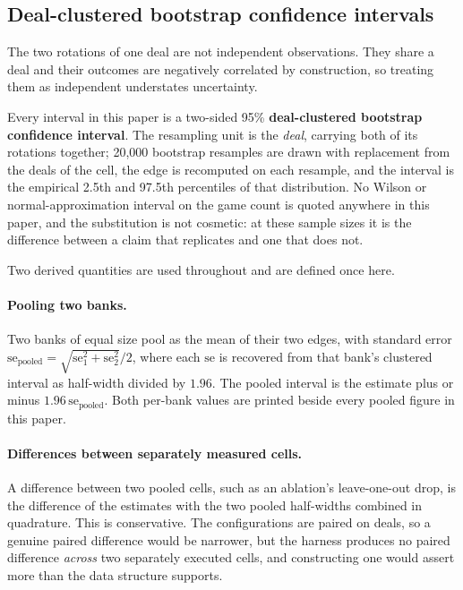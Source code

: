 \subsection{Deal-clustered bootstrap confidence intervals}
\label{sec:evaluation-intervals}

The two rotations of one deal are not independent observations. They share a deal and their outcomes
are negatively correlated by construction, so treating them as independent understates uncertainty.

Every interval in this paper is a two-sided 95\% \textbf{deal-clustered bootstrap confidence
interval}. The resampling unit is the \emph{deal}, carrying both of its rotations together; 20{,}000
bootstrap resamples are drawn with replacement from the deals of the cell, the edge is recomputed on
each resample, and the interval is the empirical 2.5th and 97.5th percentiles of that distribution.
No Wilson or normal-approximation interval on the game count is quoted anywhere in this paper, and
the substitution is not cosmetic: at these sample sizes it is the difference between a claim that
replicates and one that does not.

Two derived quantities are used throughout and are defined once here.

\paragraph{Pooling two banks.} Two banks of equal size pool as the mean of their two edges, with standard
  error $\mathrm{se}_{\text{pooled}} = \sqrt{\mathrm{se}_1^2 + \mathrm{se}_2^2}/2$, where each
  $\mathrm{se}$ is recovered from that bank's clustered interval as half-width divided by $1.96$. The
  pooled interval is the estimate plus or minus $1.96\,\mathrm{se}_{\text{pooled}}$. Both per-bank
  values are printed beside every pooled figure in this paper.
\paragraph{Differences between separately measured cells.} A difference between two pooled cells, such as
  an ablation's leave-one-out drop, is the difference of the estimates with the two pooled half-widths
  combined in quadrature. This is conservative. The configurations are paired on deals, so a genuine
  paired difference would be narrower, but the harness produces no paired difference \emph{across} two
  separately executed cells, and constructing one would assert more than the data structure supports.

